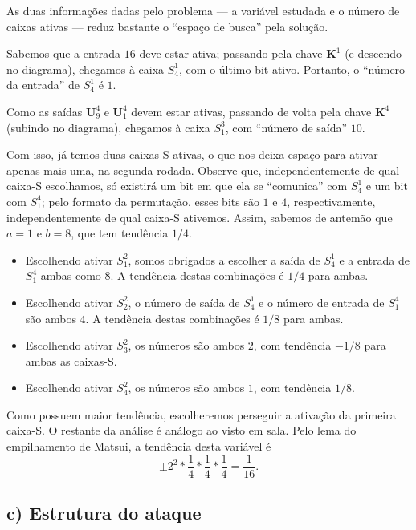 \documentclass{article}
\newcommand{\U}{\textbf{U}}
\newcommand{\K}{\textbf{K}}
\begin{document}
As duas informações dadas pelo problema
--- a variável estudada e o número de caixas ativas ---
reduz bastante o ``espaço de busca'' pela solução.

Sabemos que a entrada $16$ deve estar ativa;
passando pela chave $\K^1$ (e descendo no diagrama),
chegamos à caixa $S_4^1$,
com o último bit ativo.
Portanto, o ``número da entrada'' de $S_4^1$ é $1$.

Como as saídas $\U_9^4$ e $\U_1^4$ devem estar ativas,
passando de volta pela chave $\K^4$ (subindo no diagrama),
chegamos à caixa $S_1^3$, com ``número de saída'' $10$.

Com isso, já temos duas caixas-S ativas,
o que nos deixa espaço para ativar apenas mais uma,
na segunda rodada.
Observe que, independentemente de qual caixa-S escolhamos,
só existirá um bit em que ela se ``comunica'' com $S_4^1$
e um bit com $S_1^4$;
pelo formato da permutação, esses bits são $1$ e $4$,
respectivamente, independentemente de qual caixa-S ativemos.
Assim, sabemos de antemão que $a = 1$ e $b = 8$,
que tem tendência $1/4$.

\begin{itemize}
    \item Escolhendo ativar $S_1^2$,
        somos obrigados a escolher a saída de $S_4^1$
        e a entrada de $S_1^4$ ambas como $8$.
        A tendência destas combinações é $1/4$ para ambas.

    \item Escolhendo ativar $S_2^2$,
        o número de saída de $S_4^1$
        e o número de entrada de $S_1^4$ são ambos $4$.
        A tendência destas combinações é $1/8$ para ambas.

    \item Escolhendo ativar $S_3^2$,
        os números são ambos $2$, com tendência $-1/8$ para ambas as caixas-S.

    \item Escolhendo ativar $S_4^2$,
        os números são ambos $1$, com tendência $1/8$.
\end{itemize}

Como possuem maior tendência,
escolheremos perseguir a ativação da primeira caixa-S.
O restante da análise é análogo ao visto em sala.
Pelo lema do empilhamento de Matsui,
a tendência desta variável é
\begin{equation*}
    \pm 2^2 * \frac 1 4 * \frac 1 4 * \frac 1 4 = \frac 1 {16}.
\end{equation*}

\subsection{c) Estrutura do ataque}
\end{document}
